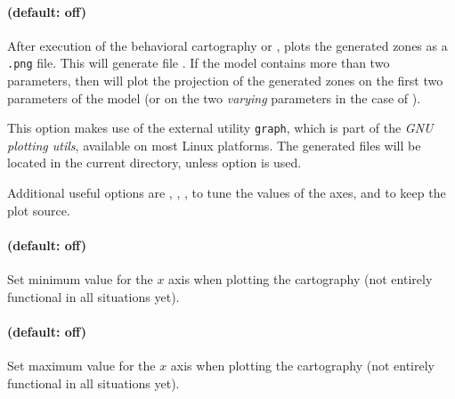 



\paragraph{ (default: off)}

After execution of the behavioral cartography or \EFsynth{}, plots the generated zones as a \texttt{.png} file.
This will generate file .
If the model contains more than two parameters, then  will plot the projection of the generated zones on the first two parameters of the model (or on the two \emph{varying} parameters in the case of \BC{}).

This option makes use of the external utility \texttt{graph}, which is
part of the \emph{GNU plotting utils}, available on most Linux
platforms.
The generated files will be located in the current directory, unless option  is used.

Additional useful options are
,
,
,
to tune the values of the axes,
and  to keep the plot source.


\paragraph{ (default: off)}
Set minimum value for the $x$ axis when plotting the cartography (not entirely functional in all situations yet).

\paragraph{ (default: off)}
Set maximum value for the $x$ axis when plotting the cartography (not entirely functional in all situations yet).

